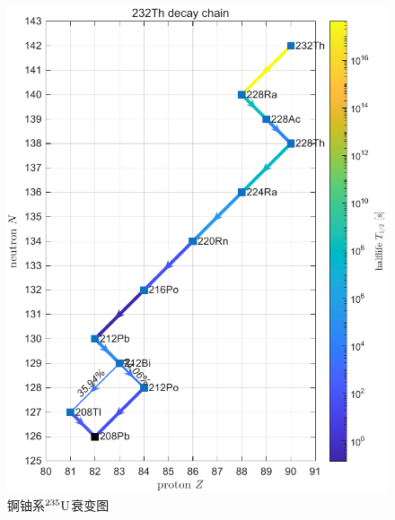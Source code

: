 \begin{figure}[hp]
	\centering
	\includegraphics[page=3]{figures/decay_system.pdf}
	\caption{锕铀系${^{235}\mathrm{U}}$衰变图}
	\label{fig:decay_system 235U}
\end{figure}





